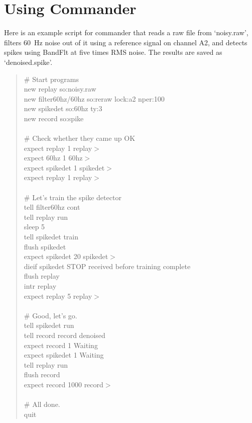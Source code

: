 \documentclass[12pt,oneside]{book}
\def\prog#1{{\bf #1}}
\def\streamtype#1{{\sc #1}\xspace}
\def\raw{\streamtype{raw}}
\begin{document}
\section{Using \prog{Commander}}

Here is an example script for commander that reads a \raw file from
`noisy.raw', filters 60~Hz noise out of it using a reference signal on
channel A2, and detects spikes using BandFlt at five times RMS noise.
The results are saved as `denoised.spike'.
\begin{quotation}\sf\small
\noindent  $\#$ Start programs
\\  new replay so:noisy.raw
\\  new filter60hz/60hz so:reraw lock:a2 nper:100
\\  new spikedet so:60hz ty:3
\\  new record so:spike
\\
\\  $\#$ Check whether they came up OK
\\  expect replay 1 replay$>$
\\  expect 60hz 1 60hz$>$
\\  expect spikedet 1 spikedet$>$
\\  expect replay 1 replay$>$
\\
\\  $\#$ Let's train the spike detector
\\  tell filter60hz cont
\\  tell replay run
\\  sleep 5
\\  tell spikedet train
\\  flush spikedet
\\  expect spikedet 20 spikedet$>$
\\  dieif spikedet STOP received before training complete
\\  flush replay
\\  intr replay
\\  expect replay 5 replay$>$
\\
\\  $\#$ Good, let's go.
\\  tell spikedet run
\\  tell record record denoised
\\  expect record 1 Waiting
\\  expect spikedet 1 Waiting
\\  tell replay run
\\  flush record
\\  expect record 1000 record$>$
\\
\\  $\#$ All done.
\\  quit
\end{quotation}
\end{document}
